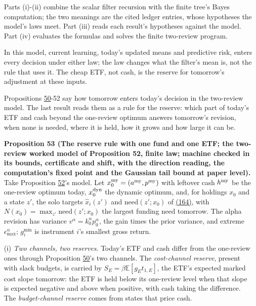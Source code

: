 \documentclass[11pt]{article}
\begin{document}
Parts (i)-(ii) combine the scalar filter recursion with the finite
tree's Bayes computation; the two meanings are the cited ledger entries,
whose hypotheses the model's laws meet. Part (iii) reads each result's
hypotheses against the model. Part (iv) evaluates the formulas and
solves the finite two-review program.

In this model, current learning, today's updated means and predictive
risk, enters every decision under either law; the law changes what the
filter's mean is, not the rule that uses it. The cheap ETF, not cash, is
the reserve for tomorrow's adjustment at these inputs.

Propositions \hyperref[res:Proposition-50]{50}-52 say how tomorrow enters today's decision in the
two-review model. The last result reads them as a rule for the
reserve: which part of today's ETF and cash beyond the one-review
optimum answers tomorrow's revision, when none is needed, where it is
held, how it grows and how large it can be.

\label{res:Proposition-53}
\textbf{Proposition 53 (The reserve rule with one fund and one ETF; the two-review worked model of Proposition 52, finite law; machine checked in its bounds, certificate and shift, with the direction reading, the computation's fixed point and the Gaussian tail bound at paper level).}
Take Proposition \hyperref[res:Proposition-52]{52}'s model. Let \(x^{\rm my}_0=(a^{\rm my},p^{\rm my})\) with leftover cash \(h^{\rm my}\)
be the one-review optimum today, \(x^{\rm dyn}_0\) the dynamic optimum, and, for
holdings \(x_0\) and a state \(z'\), the solo targets \(\hat x_i(z')\) and \(\mathrm{need}(z';x_0)\)
of \hyperref[eq:164]{(164)}, with \(N(x_0)=\max_{z'}\mathrm{need}(z';x_0)\) the largest funding need
tomorrow. The alpha revision has variance \(v^\alpha=k^\alpha_0p^\alpha_0\), the gain times
the prior variance, and extreme \(\epsilon^\alpha_{\max}\); \(g^{\min}_i\) is instrument \(i\)'s smallest
gross return.

(i) \emph{Two channels, two reserves.} Today's ETF and cash differ from the
one-review ones through Proposition \hyperref[res:Proposition-50]{50}'s two channels. The
\emph{cost-channel reserve}, present with slack budgets, is carried by
\(S_E=\beta\mathbb E[g_Et_{1,E}]\), the ETF's expected marked cost slope tomorrow: the
ETF is held below its one-review level when that slope is expected
negative and above when positive, with cash taking the difference.
The \emph{budget-channel reserve} comes from states that price cash.
\end{document}
